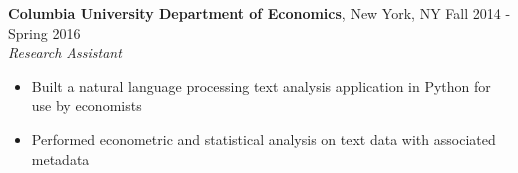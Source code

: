 \documentclass{res}
\begin{document}
\begin{resume}
\begin{comment}
\textbf{Big Data Summer Institute}, University of Michigan, Ann Arbor, MI \hfill Summer 2015
\\ \textit{Intern}
\begin{itemize}
\item Implemented a search and counting algorithm for sub-sequences of the human genome
\item Attended lectures on machine learning, algorithms, data science, and statistics 
\item Presented work to faculty and undergraduates to promote the program to other institutions
\end{itemize}
\end{comment}

\textbf{Columbia University Department of Economics}, New York, NY \hfill Fall 2014 - Spring 2016\\
\textit{Research Assistant}
\begin{itemize}
\item Built a natural language processing text analysis application in Python for use by economists 
\item Performed econometric and statistical analysis on text data with associated metadata
\end{itemize}

\begin{comment}
	\textbf{Center for Discrete Mathematics and Theoretical Computer Science}, Piscataway, NJ\\
\textit{Research Intern} \hfill Summer 2014 
\begin{itemize}
\item Implemented a spectral machine learning algorithm in Python to learn a Hidden Markov Model
\item Improved algorithm runtime 100x through utilization of Python's NumPy and SciPy libraries
\item Presented results to colleagues and faculty to gain feedback
\end{itemize}

\textbf{Columbia University Departments of Mathematics and Statistics}, New York, NY
  \\ \textit{Undergraduate Teaching Assistant}\hfill Spring 2014 - Spring 2016
\begin{itemize}
\item Held regular office hours for calculus, linear algebra, and statistics students
\item Evaluated assignments and provided feedback to students
\end{itemize}
\end{comment}



\end{resume}
\end{document}

